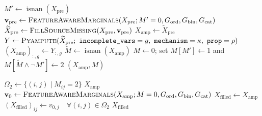 \begin{algorithm}[ht]
\begin{algorithmic}[1]
  \Statex
    \State $M' \gets \operatorname{isnan}(X_{\text{pre}})$ 
    \State $\mathbf v_{\text{pre}} \gets \textsc{FeatureAwareMarginals}(X_{\text{pre}};M'=0,G_{\text{ord}},G_{\text{bin}},G_{\text{cat}})$
    \State $\widetilde X_{\text{pre}} \gets \textsc{FillSourceMissing}(X_{\text{pre}},\mathbf v_{\text{pre}})$
    \State $X_{\text{amp}} \gets \widetilde X_{\text{pre}}$
      \State $Y \gets \textsc{Pyampute}(\widetilde X_{\text{pre}};\ \texttt{incomplete\_vars}=g,\ \texttt{mechanism}=\kappa,\ \texttt{prop}=\rho)$
      \State $(X_{\text{amp}})_{:,g} \gets Y_{:,g}$
    \EndFor
    \State $\widetilde M \gets \operatorname{isnan}(X_{\text{amp}})$
    \State $M \gets 0$; set $M[M']\gets 1$ and $M[\widetilde M\land\neg M']\gets 2$
    \State \Return $(X_{\text{amp}}, M)$
  \EndProcedure

  \Statex
    \State $\Omega_2 \gets \{(i,j)\mid M_{ij}=2\}$
      \State \Return $X_{\text{amp}}$
    \EndIf
    \State $\mathbf v_0 \gets \textsc{FeatureAwareMarginals}(X_{\text{amp}};M=0,G_{\text{ord}},G_{\text{bin}},G_{\text{cat}})$
    \State $X_{\text{filled}} \gets X_{\text{amp}}$
    \State $(X_{\text{filled}})_{ij} \gets v_{0,j}\quad\forall(i,j)\in\Omega_2$
    \State \Return $X_{\text{filled}}$
  \EndProcedure

\end{algorithmic}
\end{algorithm}
